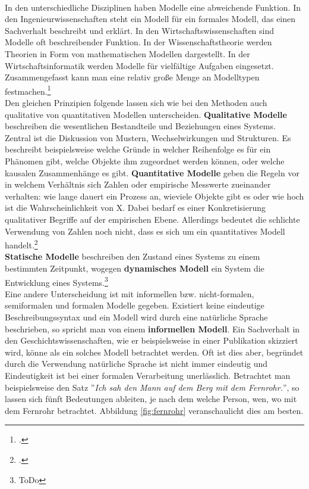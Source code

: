 \documentclass[12pt,a4paper]{article}
\begin{document}
\\
In den unterschiedliche Disziplinen haben Modelle eine abweichende Funktion. In den Ingenieurwissenschaften steht ein Modell für ein formales Modell, das einen Sachverhalt beschreibt und erklärt. In den Wirtschaftswissenschaften sind Modelle oft beschreibender Funktion. In der Wissenschaftstheorie werden Theorien in Form von mathematischen Modellen dargestellt. In der Wirtschaftsinformatik werden Modelle für vielfältige Aufgaben eingesetzt. Zusammengefasst kann man eine relativ große Menge an Modelltypen festmachen.\footcite[][S.41-44]{kobler2010qualitat}
\\
Den gleichen Prinzipien folgende lassen sich wie bei den Methoden auch qualitative von quantitativen Modellen unterscheiden. \textbf{Qualitative Modelle} beschreiben die wesentlichen Bestandteile und Beziehungen eines Systems. Zentral ist die Diskussion von Mustern, Wechselwirkungen und Strukturen. Es beschreibt beispielsweise welche Gründe in welcher Reihenfolge es für ein Phänomen gibt, welche Objekte ihm zugeordnet werden können, oder welche kausalen Zusammenhänge es gibt. \textbf{Quantitative Modelle} geben die Regeln vor in welchem Verhältnis sich Zahlen oder empirische Messwerte  zueinander verhalten: wie lange dauert ein Prozess an, wieviele Objekte gibt es oder wie hoch ist die Wahrscheinlichkeit von X. Dabei bedarf es einer Konkretisierung qualitativer Begriffe auf der empirischen Ebene. Allerdings bedeutet die schlichte Verwendung von Zahlen noch nicht, dass es sich um ein quantitatives Modell handelt.\footcite[][S.309–329]{wolf1995qualitative}
\\
\textbf{Statische Modelle} beschreiben den Zustand eines Systems zu einem bestimmten Zeitpunkt, wogegen \textbf{dynamisches Modell} ein System die Entwicklung eines Systems.\footnote{ToDo}
\\
Eine andere Unterscheidung ist mit informellen bzw. nicht-formalen, semiformalen und formalen Modelle gegeben. Existiert keine eindeutige Beschreibungssyntax und ein Modell wird durch eine natürliche Sprache beschrieben, so spricht man von einem \textbf{informellen Modell}. Ein Sachverhalt in den Geschichtswissenschaften, wie er beispielsweise in einer Publikation skizziert wird, könne als ein solches Modell betrachtet werden. Oft ist dies aber, begründet durch die Verwendung natürliche Sprache ist nicht immer eindeutig und Eindeutigkeit ist bei einer formalen Verarbeitung unerlässlich. Betrachtet man beispielsweise den Satz ''\textit{Ich sah den Mann auf dem Berg mit dem Fernrohr.}'', so lassen sich fünft Bedeutungen ableiten, je nach dem welche Person, wen, wo mit dem Fernrohr betrachtet. Abbildung \ref{fig:fernrohr} veranschaulicht dies am besten.
\end{document}
